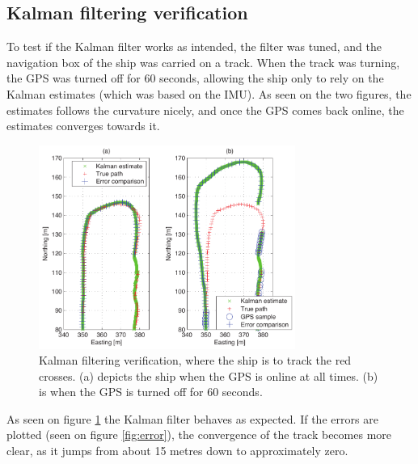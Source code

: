 \documentclass{ifacconf}
\begin{document}
\subsection{Kalman filtering verification}
To test if the Kalman filter works as intended, the filter was tuned, and the navigation box of the ship was carried on a track. When the track was turning, the GPS was turned off for 60 seconds, allowing the ship only to rely on the Kalman estimates (which was based on the IMU). As seen on the two figures, the estimates follows the curvature nicely, and once the GPS comes back online, the estimates converges towards it. 
\begin{figure}
	\begin{center}
		\includegraphics[width=8.4cm]{img/track}    %
		\caption{Kalman filtering verification, where the ship is to track the red crosses. (a) depicts the ship when the GPS is online at all times. (b) is when the GPS is turned off for 60 seconds.}  %
		\label{fig:track}               
	\end{center}                                 %
\end{figure}
As seen on figure \ref{fig:track} the Kalman filter behaves as expected. If the errors are plotted (seen on figure \ref{fig:error}), the convergence of the track becomes more clear, as it jumps from about 15 metres down to approximately zero. 
\end{document}
